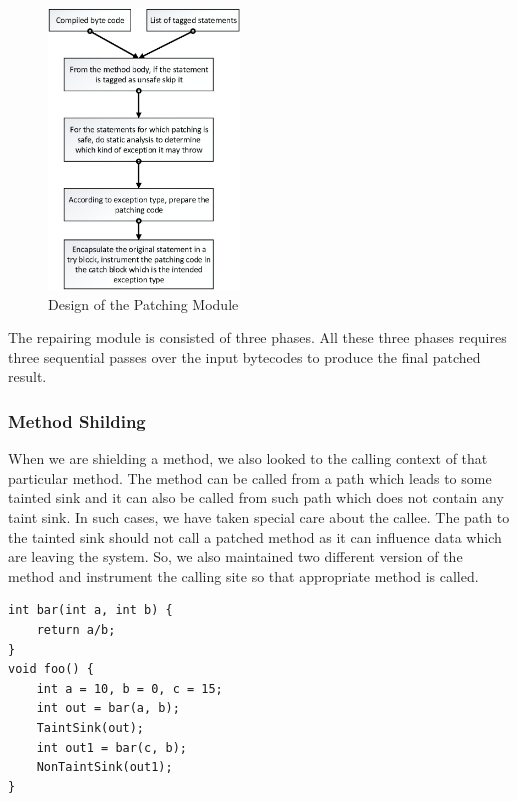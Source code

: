 \begin{figure}
\centering
  \includegraphics[width= 2.0in]{images/PatchModule.png}
  \caption{Design of the Patching Module}
  \label{fig:PatchModule}
\end{figure}

The repairing module is consisted of three phases. All these three phases
requires three sequential passes over the input bytecodes to produce the final
patched result.


\subsubsection{Method Shilding}
\label{MethodShilding}


When we are shielding a method, we also looked to the calling context of that
particular method. The method can be called from a path which leads to some
tainted sink and it can also be called from such path which does not contain
any taint sink. In such cases, we have taken special care about the callee. The
path to the tainted sink should not call a patched method as it can influence
data which are leaving the system. So, we also maintained two different version
of
the method and instrument the calling site so that appropriate method is called.

\lstset{language=java, caption = Same method calling in different scenario,
label=callingContext}
\begin{lstlisting}[countblanklines=false]
int bar(int a, int b) {
    return a/b;
}
void foo() {
    int a = 10, b = 0, c = 15;
    int out = bar(a, b);
    TaintSink(out);
    int out1 = bar(c, b);
    NonTaintSink(out1);
}
\end{lstlisting}


\lstset{language=java, caption = Mehod name modification for different calling
context, label=callingContextPatch}


